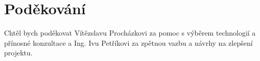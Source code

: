 \clearpageenabledfalse %
\newpage

\section*{Poděkování}

Chtěl bych poděkovat Vítězslavu Procházkovi za pomoc s výběrem technologií a přínosné konzultace a Ing. Ivu Petříkovi za zpětnou vazbu a návrhy na zlepšení projektu. 

\clearpageenabledtrue
